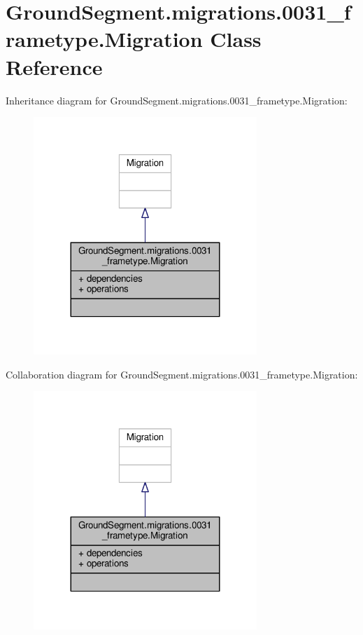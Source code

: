 \hypertarget{class_ground_segment_1_1migrations_1_10031__frametype_1_1_migration}{}\section{Ground\+Segment.\+migrations.0031\+\_\+frametype.Migration Class Reference}
\label{class_ground_segment_1_1migrations_1_10031__frametype_1_1_migration}


Inheritance diagram for Ground\+Segment.\+migrations.0031\+\_\+frametype.Migration\+:\nopagebreak
\begin{figure}[H]
\begin{center}
\leavevmode
\includegraphics[width=239pt]{class_ground_segment_1_1migrations_1_10031__frametype_1_1_migration__inherit__graph}
\end{center}
\end{figure}


Collaboration diagram for Ground\+Segment.\+migrations.0031\+\_\+frametype.Migration\+:\nopagebreak
\begin{figure}[H]
\begin{center}
\leavevmode
\includegraphics[width=239pt]{class_ground_segment_1_1migrations_1_10031__frametype_1_1_migration__coll__graph}
\end{center}
\end{figure}
